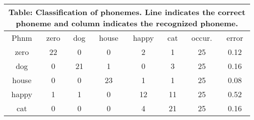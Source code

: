\documentclass[10pt]{article}
\begin{document}
\tiny
\begin{tabular}{|@{}c@{}||@{}c@{}|@{}c@{}|@{}c@{}|@{}c@{}|@{}c@{}|@{}c@{}|@{}c@{}|}
\hline
\multicolumn{8}{c}{Table: Classification of phonemes. Line indicates the correct phoneme and column indicates the recognized phoneme.} \\ \hline \hline
Phnm & zero & dog & house & happy & cat & occur. & error \\ \hline
zero & 22 & 0 & 0 & 2 & 1 & 25 & 0.12 \\ \hline
dog & 0 & 21 & 1 & 0 & 3 & 25 & 0.16 \\ \hline
house & 0 & 0 & 23 & 1 & 1 & 25 & 0.08 \\ \hline
happy & 1 & 1 & 0 & 12 & 11 & 25 & 0.52 \\ \hline
cat & 0 & 0 & 0 & 4 & 21 & 25 & 0.16 \\ \hline
\end{tabular}
\end{document}
